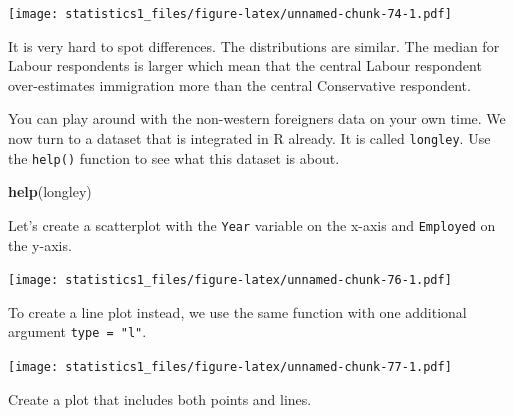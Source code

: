 \documentclass[]{book}
\newenvironment{Shaded}{\begin{snugshade}}{\end{snugshade}}
\newcommand{\KeywordTok}[1]{\textcolor[rgb]{0.13,0.29,0.53}{\textbf{#1}}}
\newcommand{\DataTypeTok}[1]{\textcolor[rgb]{0.13,0.29,0.53}{#1}}
\newcommand{\StringTok}[1]{\textcolor[rgb]{0.31,0.60,0.02}{#1}}
\newcommand{\CommentTok}[1]{\textcolor[rgb]{0.56,0.35,0.01}{\textit{#1}}}
\newcommand{\OperatorTok}[1]{\textcolor[rgb]{0.81,0.36,0.00}{\textbf{#1}}}
\newcommand{\NormalTok}[1]{#1}
\theoremstyle{definition}
\theoremstyle{definition}
\theoremstyle{definition}
\theoremstyle{remark}
\begin{document}
\texttt{[image: statistics1\_files/figure-latex/unnamed-chunk-74-1.pdf]}

It is very hard to spot differences. The distributions are similar. The
median for Labour respondents is larger which mean that the central
Labour respondent over-estimates immigration more than the central
Conservative respondent.

You can play around with the non-western foreigners data on your own
time. We now turn to a dataset that is integrated in R already. It is
called \texttt{longley}. Use the \texttt{help()} function to see what
this dataset is about.

\begin{Shaded}
\begin{Highlighting}[]
\KeywordTok{help}\NormalTok{(longley)}
\end{Highlighting}
\end{Shaded}

Let's create a scatterplot with the \texttt{Year} variable on the x-axis
and \texttt{Employed} on the y-axis.

\begin{Shaded}
\end{Shaded}

\texttt{[image: statistics1\_files/figure-latex/unnamed-chunk-76-1.pdf]}

To create a line plot instead, we use the same function with one
additional argument \texttt{type\ =\ "l"}.

\begin{Shaded}
\end{Shaded}

\texttt{[image: statistics1\_files/figure-latex/unnamed-chunk-77-1.pdf]}

Create a plot that includes both points and lines.
\end{document}
